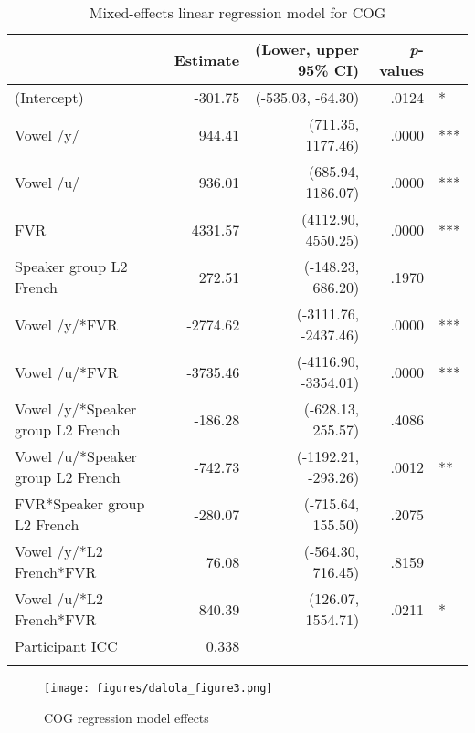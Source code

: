 \documentclass[output=paper,colorlinks,citecolor=brown,draftmode]{langscibook}
\begin{document}
\begin{table}[p]
\caption{Mixed-effects linear regression model for COG}
\begin{tabularx}{\textwidth}{Qrrrl}
 \lsptoprule
   & \textbf{Estimate} & \textbf{(Lower, upper 95\% CI)} & \textbf{\emph{p}-values} &  \\ [0.5ex]
 \midrule
 (Intercept) & -301.75 & (-535.03, -64.30) & .0124 & * \\
 Vowel /y/ & 944.41 & (711.35, 1177.46) & .0000 & *** \\
 Vowel /u/ & 936.01 & (685.94, 1186.07) & .0000 & *** \\
 FVR & 4331.57 & (4112.90, 4550.25) & .0000 & *** \\
 Speaker group L2 French & 272.51 & (-148.23, 686.20) & .1970 & \\
 Vowel /y/*FVR & -2774.62 & (-3111.76, -2437.46) & .0000 & *** \\
 Vowel /u/*FVR & -3735.46 & (-4116.90, -3354.01) & .0000 & *** \\
 Vowel /y/*Speaker group L2 French & -186.28 & (-628.13, 255.57) & .4086 &  \\
 Vowel /u/*Speaker group L2 French & -742.73 & (-1192.21, -293.26) & .0012 & ** \\
 FVR*Speaker group L2 French & -280.07 & (-715.64, 155.50) & .2075 &  \\
 Vowel /y/*L2 French*FVR & 76.08 & (-564.30, 716.45) & .8159 & \\
 Vowel /u/*L2 French*FVR & 840.39 & (126.07, 1554.71) & .0211 & * \\
 \midrule
 Participant ICC & 0.338 &  \\
\lspbottomrule
\end{tabularx}
\label{table:2}
\end{table}

\clearpage


\begin{figure}
    \texttt{[image: figures/dalola\_figure3.png]}
    \caption{COG regression model effects}
    \label{figure3}
\end{figure}
\end{document}
